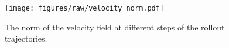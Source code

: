 \begin{figure}
    \centering
    \texttt{[image: figures/raw/velocity\_norm.pdf]}
    \caption{The norm of the velocity field at different steps of the rollout trajectories.}
    \label{fig:eagle_velocity}
    \vspace{-10pt}
\end{figure}
